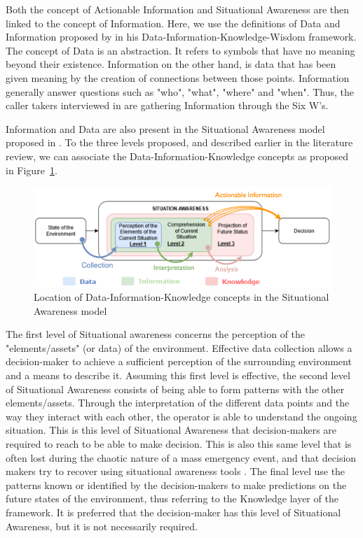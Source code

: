 Both the concept of Actionable Information and Situational Awareness are then linked to the concept of Information.
Here, we use the definitions of Data and Information proposed by \textcite{ackoffDataWisdom1989} in his Data-Information-Knowledge-Wisdom framework.
The concept of Data is an abstraction.
It refers to symbols that have no meaning beyond their existence.
Information on the other hand, is data that has been given meaning by the creation of connections between those points.
Information generally answer questions such as "who", "what", "where" and "when".
Thus, the caller takers interviewed in \textcite{kropczynskiIdentifyingActionableInformation2018} are gathering Information through the Six W's.

Information and Data are also present in the Situational Awareness model proposed in \textcite{endsleyTheorySituationAwareness1995}.
To the three levels proposed, and described earlier in the literature review, we can associate the Data-Information-Knowledge concepts as proposed in Figure~\ref{information:SA-DIK}.

\begin{figure}
    \centering
    \includegraphics[width=\textwidth]{figures/chap-3/Fig2-2.pdf}
    \caption{Location of Data-Information-Knowledge concepts in the Situational Awareness model}
    \label{information:SA-DIK}
\end{figure}

The first level of Situational awareness concerns the perception of the "elements/assets" (or data) of the environment.
Effective data collection allows a decision-maker to achieve a sufficient perception of the surrounding environment and a means to describe it.
Assuming this first level is effective, the second level of Situational Awareness consists of being able to form patterns with the other elements/assets.
Through the interpretation of the different data points and the way they interact with each other, the operator is able to understand the ongoing situation.
This is this level of Situational Awareness that decision-makers are required to reach to be able to make decision.
This is also this same level that is often lost during the chaotic nature of a mass emergency event, and that decision makers try to recover using situational awareness tools \parencite{endsleyTheorySituationAwareness1995}.
The final level use the patterns known or identified by the decision-makers to make predictions on the future states of the environment, thus referring to the Knowledge layer of the framework.
It is preferred that the decision-maker has this level of Situational Awareness, but it is not necessarily required.

